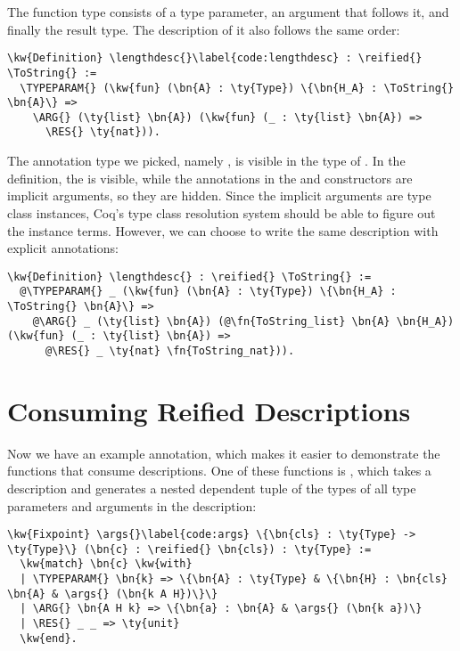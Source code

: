 The function type consists of a type parameter, an argument that follows it, and finally the result type. The \reified{} description of it also follows the same order:

\newcommand{\lengthdesc}{\hyperref[code:lengthdesc]{\fn{length\_\linebreak[0]desc}}}
\begin{Verbatim}
\kw{Definition} \lengthdesc{}\label{code:lengthdesc} : \reified{} \ToString{} :=
  \TYPEPARAM{} (\kw{fun} (\bn{A} : \ty{Type}) \{\bn{H_A} : \ToString{} \bn{A}\} =>
    \ARG{} (\ty{list} \bn{A}) (\kw{fun} (_ : \ty{list} \bn{A}) =>
      \RES{} \ty{nat})).
\end{Verbatim}

The annotation type we picked, namely \ToString{}, is visible in the type of \lengthdesc{}. In the definition, the  is visible, while the annotations in the  and  constructors are implicit arguments, so they are hidden. Since the implicit arguments are type class instances, Coq's type class resolution system should be able to figure out the instance terms. However, we can choose to write the same description with explicit annotations:

\begin{Verbatim}
\kw{Definition} \lengthdesc{} : \reified{} \ToString{} :=
  @\TYPEPARAM{} _ (\kw{fun} (\bn{A} : \ty{Type}) \{\bn{H_A} : \ToString{} \bn{A}\} =>
    @\ARG{} _ (\ty{list} \bn{A}) (@\fn{ToString_list} \bn{A} \bn{H_A}) (\kw{fun} (_ : \ty{list} \bn{A}) =>
      @\RES{} _ \ty{nat} \fn{ToString_nat})).
\end{Verbatim}

\section{Consuming Reified Descriptions}

\newcommand{\args}{\hyperref[code:args]{\fn{args}}}
Now we have an example annotation, which makes it easier to demonstrate the functions that consume \reified{} descriptions. One of these functions is \args{}, which takes a \reified{} description and generates a nested dependent tuple of the types of all type parameters and arguments in the description:

\begin{Verbatim}
\kw{Fixpoint} \args{}\label{code:args} \{\bn{cls} : \ty{Type} -> \ty{Type}\} (\bn{c} : \reified{} \bn{cls}) : \ty{Type} :=
  \kw{match} \bn{c} \kw{with}
  | \TYPEPARAM{} \bn{k} => \{\bn{A} : \ty{Type} & \{\bn{H} : \bn{cls} \bn{A} & \args{} (\bn{k A H})\}\}
  | \ARG{} \bn{A H k} => \{\bn{a} : \bn{A} & \args{} (\bn{k a})\}
  | \RES{} _ _ => \ty{unit}
  \kw{end}.
\end{Verbatim}

